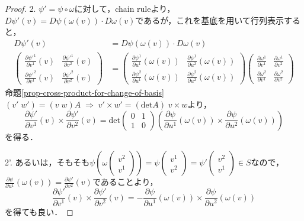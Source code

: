 \documentclass[uplatex, dvipdfmx]{jsreport}
\begin{document}
\begin{proof}
    2. $\psi'=\psi\circ\omega$に対して，chain ruleより，$D\psi'(v)=D\psi(\omega(v))\cdot D\omega(v)$であるが，これを基底を用いて行列表示すると，
    \begin{align*}
        D\psi'(v)&=D\psi(\omega(v))\cdot D\omega(v) \\
        \begin{pmatrix}\frac{\partial\psi'^1}{\partial v^1}(v)&\frac{\partial\psi'^1}{\partial v^2}(v)\\\frac{\partial\psi'^2}{\partial v^1}(v)&\frac{\partial\psi'^2}{\partial v^2}(v)\end{pmatrix}
        &= \begin{pmatrix}\frac{\partial\psi^1}{\partial u^1}(\omega(v))&\frac{\partial\psi^1}{\partial u^2}(\omega(v))\\\frac{\partial\psi^2}{\partial u^1}(\omega(v))&\frac{\partial\psi^2}{\partial u^2}(\omega(v))\end{pmatrix} \begin{pmatrix}\frac{\partial\omega^1}{\partial v^1}&\frac{\partial\omega^1}{\partial v^2}\\\frac{\partial\omega^2}{\partial v^1}&\frac{\partial\omega^2}{\partial v^2}\end{pmatrix} 
    \end{align*}
    命題\ref{prop-cross-product-for-change-of-basis}$(v'\;w')=(v\;w)A\;\Rightarrow\; v'\times w'=(\mathrm{det}A)\;v\times w$より，
    \[ \frac{\partial\psi'}{\partial v^1}(v)\times\frac{\partial\psi'}{\partial v^2}(v) = \mathrm{det}\begin{pmatrix}0&1\\1&0\end{pmatrix}\left( \frac{\partial\psi}{\partial u^1}(\omega(v))\times \frac{\partial\psi}{\partial u^2}(\omega(v))\right) \]
    を得る．
    
    2'. あるいは，そもそも$\psi\left(\omega\begin{pmatrix}v^2\\v^1\end{pmatrix}\right)=\psi\begin{pmatrix}v^1\\v^2\end{pmatrix}=\psi'\begin{pmatrix}v^2\\v^1\end{pmatrix}\in S$なので，$\frac{\partial \psi}{\partial u^1}(\omega(v))=\frac{\partial \psi'}{\partial v^2}(v)$であることより，
    \[ \frac{\partial\psi'}{\partial v^1}(v)\times\frac{\partial\psi'}{\partial v^2}(v) = -\frac{\partial\psi}{\partial u^1}(\omega(v))\times \frac{\partial\psi}{\partial u^2}(\omega(v)) \]
    を得ても良い．


\end{proof}
\end{document}
